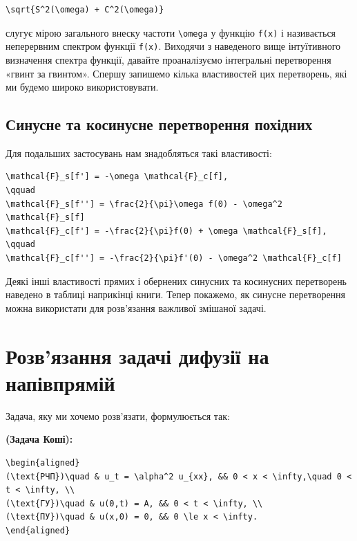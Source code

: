 \documentclass[
  ukrainian,
]{article}
\begin{document}
\begin{verbatim}
\sqrt{S^2(\omega) + C^2(\omega)}
\end{verbatim}

слугує мірою загального внеску частоти \texttt{\textbackslash{}omega} у
функцію \texttt{f(x)} і називається неперервним спектром функції
\texttt{f(x)}. Виходячи з наведеного вище інтуїтивного визначення
спектра функції, давайте проаналізуємо інтегральні перетворення «гвинт
за гвинтом». Спершу запишемо кілька властивостей цих перетворень, які ми
будемо широко використовувати.

\subsection{Синусне та косинусне перетворення
похідних}\label{ux441ux438ux43dux443ux441ux43dux435-ux442ux430-ux43aux43eux441ux438ux43dux443ux441ux43dux435-ux43fux435ux440ux435ux442ux432ux43eux440ux435ux43dux43dux44f-ux43fux43eux445ux456ux434ux43dux438ux445}

Для подальших застосувань нам знадобляться такі властивості:

\begin{verbatim}
\mathcal{F}_s[f'] = -\omega \mathcal{F}_c[f],
\qquad
\mathcal{F}_s[f''] = \frac{2}{\pi}\omega f(0) - \omega^2 \mathcal{F}_s[f]
\mathcal{F}_c[f'] = -\frac{2}{\pi}f(0) + \omega \mathcal{F}_s[f],
\qquad
\mathcal{F}_c[f''] = -\frac{2}{\pi}f'(0) - \omega^2 \mathcal{F}_c[f]
\end{verbatim}

Деякі інші властивості прямих і обернених синусних та косинусних
перетворень наведено в таблиці наприкінці книги. Тепер покажемо, як
синусне перетворення можна використати для розв'язання важливої змішаної
задачі.

\section{Розв'язання задачі дифузії на
напівпрямій}\label{ux440ux43eux437ux432ux44fux437ux430ux43dux43dux44f-ux437ux430ux434ux430ux447ux456-ux434ux438ux444ux443ux437ux456ux457-ux43dux430-ux43dux430ux43fux456ux432ux43fux440ux44fux43cux456ux439}

Задача, яку ми хочемо розв'язати, формулюється так:

\textbf{(Задача Коші):}

\begin{verbatim}
\begin{aligned}
(\text{РЧП})\quad & u_t = \alpha^2 u_{xx}, && 0 < x < \infty,\quad 0 < t < \infty, \\
(\text{ГУ})\quad & u(0,t) = A, && 0 < t < \infty, \\
(\text{ПУ})\quad & u(x,0) = 0, && 0 \le x < \infty.
\end{aligned}
\end{verbatim}
\end{document}
